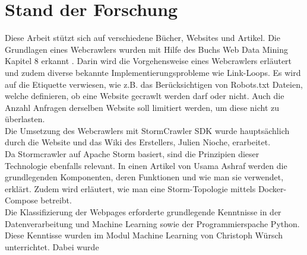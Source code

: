\chapter{Stand der Forschung}
Diese Arbeit stützt sich auf verschiedene Bücher, Websites und Artikel.
Die Grundlagen eines Webcrawlers wurden mit Hilfe des Buchs \glqq Web Data Mining\grqq{} Kapitel 8 erkannt \cite[p. 311ff.]{liu2007web}. 
Darin wird die Vorgehensweise eines Webcrawlers erläutert und zudem diverse bekannte Implementierungsprobleme wie Link-Loops.
Es wird auf die Etiquette verwiesen, wie z.B. das Berücksichtigen von Robots.txt Dateien, welche definieren, ob eine Website gecrawlt werden darf oder nicht\cite[p. 353ff.]{liu2007web}.
Auch die Anzahl Anfragen derselben Website soll limitiert werden, um diese nicht zu überlasten\cite[p. 353ff.]{liu2007web}.\\
Die Umsetzung des Webcrawlers mit StormCrawler SDK wurde hauptsächlich durch die Website\cite{StormCrawler} und das Wiki des Erstellers\cite{GithubStormCrawler}, Julien Nioche, erarbeitet.\\
Da Stormcrawler auf Apache Storm basiert, sind die Prinzipien dieser Technologie ebenfalls relevant.
In einen Artikel von Usama Ashraf werden die grundlegenden Komponenten, deren Funktionen und wie man sie verwendet, erklärt.
Zudem wird erläutert, wie man eine Storm-Topologie mittels Docker-Compose betreibt\cite{ApacheStormDev}.\\
Die Klassifizierung der Webpages erforderte grundlegende Kenntnisse in der Datenverarbeitung und Machine Learning sowie der Programmierspache Python.
Diese Kenntisse wurden im Modul \glqq Machine Learning\grqq{} von Christoph Würsch unterrichtet.
Dabei wurde 
